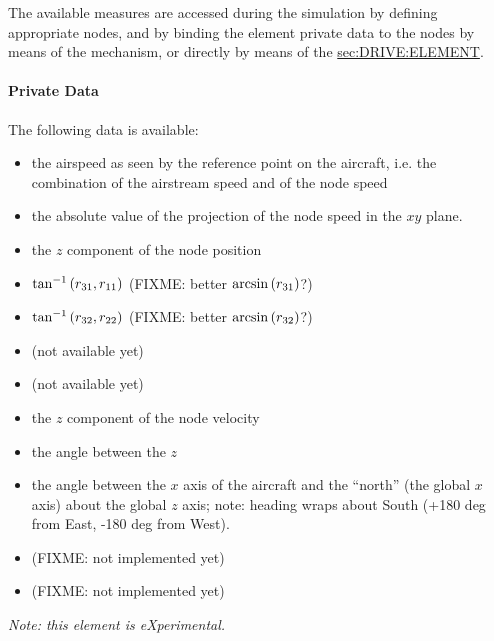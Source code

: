 The available measures are accessed during the simulation 
by defining appropriate  nodes, and by binding
the  element private data to the nodes 
by means of the  mechanism, or directly by means
of the 
\hyperref{\kw{element} drive}{\kw{element} drive (see Section~}{)}{sec:DRIVE:ELEMENT}.

\paragraph{Private Data}
The following data is available:
\begin{itemize}
\item {} the airspeed as seen by the reference 
	point on the aircraft, i.e. the combination 
	of the airstream speed and of the node speed
\item {} the absolute value of the projection
	of the node speed in the $xy$ plane.
\item {} the $z$ component of the node position
\item {} $\tan^{-1}\left( r_{31}, r_{11} \right)$
	(FIXME: better $\arcsin\left( r_{31} \right)$?)
\item {} $\tan^{-1}\left( r_{32}, r_{22} \right)$
	(FIXME: better $\arcsin\left( r_{32} \right)$?)
\item {} (not available yet)
\item {} (not available yet)
\item {} the $z$ component of the node velocity
\item {} the angle between the $z$ 
\item {} the angle between the $x$ axis of the aircraft 
	and the ``north'' (the global $x$ axis) about the global $z$ axis;
	note: heading wraps about South
	(+180 deg from East, -180 deg from West).
\item {} (FIXME: not implemented yet)
\item {} (FIXME: not implemented yet)
\end{itemize}

\noindent
\emph{Note: this element is eXperimental.}




